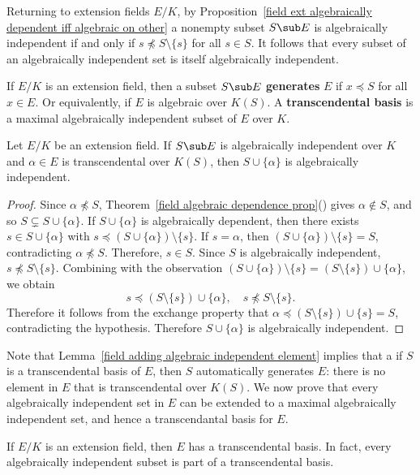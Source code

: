 Returning to extension fields $E/K$, by Proposition~\ref{field ext algebraically dependent iff algebraic on other} a nonempty subset $S\sub E$ is algebraically independent if and only if $s\not\preceq S\setminus\{s\}$ for all $s\in S$. It follows that every subset of an algebraically independent set is itself algebraically independent.
\begin{definition}
If $E/K$ is an extension field, then a subset $S\sub E$ \textbf{generates} $E$ if $x\preceq S$ for all $x\in E$. Or equivalently, if $E$ is algebraic over $K(S)$. A \textbf{transcendental basis} is a maximal algebraically independent subset of $E$ over $K$.
\end{definition}
\begin{lemma}\label{field adding algebraic independent element}
Let $E/K$ be an extension field. If $S\sub E$ is algebraically independent over $K$ and $\alpha\in E$ is transcendental over $K(S)$, then $S\cup\{\alpha\}$ is algebraically independent.
\end{lemma}
\begin{proof}
Since $\alpha\not\preceq S$, Theorem~\ref{field algebraic dependence prop}() gives $\alpha\notin S$, and so $S\subsetneq S\cup\{\alpha\}$. If $S\cup\{\alpha\}$ is algebraically dependent, then there exists $s\in S\cup\{\alpha\}$ with $s\preceq(S\cup\{\alpha\})\setminus\{s\}$. If $s=\alpha$, then $(S\cup\{\alpha\})\setminus\{s\}=S$, contradicting $\alpha\not\preceq S$. Therefore, $s\in S$. Since $S$ is algebraically independent, $s\not\preceq S\setminus\{s\}$. Combining with the observation $(S\cup\{\alpha\})\setminus\{s\}=(S\setminus\{s\})\cup\{\alpha\}$, we obtain
\[s\preceq(S\setminus\{s\})\cup\{\alpha\},\quad s\not\preceq S\setminus\{s\}.\]
Therefore it follows from the exchange property that $\alpha\preceq(S\setminus\{s\})\cup\{s\}=S$, contradicting the hypothesis. Therefore $S\cup\{\alpha\}$ is algebraically independent.
\end{proof}
Note that Lemma~\ref{field adding algebraic independent element} implies that a if $S$ is a transcendental basis of $E$, then $S$ automatically generates $E$: there is no element in $E$ that is transcendental over $K(S)$. We now prove that every algebraically independent set in $E$ can be extended to a maximal algebraically independent set, and hence a transcendantal basis for $E$.
\begin{theorem}\label{field transcendental basis exist} 
If $E/K$ is an extension field, then $E$ has a transcendental basis. In fact, every algebraically independent subset is part of a transcendental basis.
\end{theorem}

